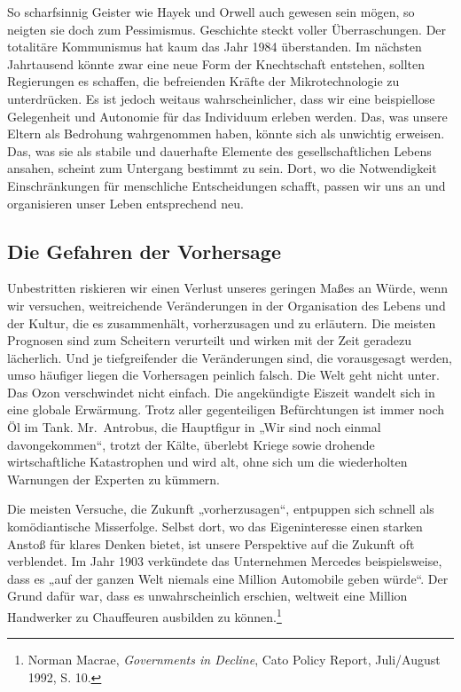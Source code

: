\documentclass[
  a5paper,
  smalldemyvopaper,10pt,twoside,onecolumn,openright,extrafontsizes,hidelinks]{memoir}
\begin{document}
So scharfsinnig Geister wie Hayek und Orwell auch gewesen sein mögen, so
neigten sie doch zum Pessimismus. Geschichte steckt voller
Überraschungen. Der totalitäre Kommunismus hat kaum das Jahr 1984
überstanden. Im nächsten Jahrtausend könnte zwar eine neue Form der
Knechtschaft entstehen, sollten Regierungen es schaffen, die befreienden
Kräfte der Mikrotechnologie zu unterdrücken. Es ist jedoch weitaus
wahrscheinlicher, dass wir eine beispiellose Gelegenheit und Autonomie
für das Individuum erleben werden. Das, was unsere Eltern als Bedrohung
wahrgenommen haben, könnte sich als unwichtig erweisen. Das, was sie als
stabile und dauerhafte Elemente des gesellschaftlichen Lebens ansahen,
scheint zum Untergang bestimmt zu sein. Dort, wo die Notwendigkeit
Einschränkungen für menschliche Entscheidungen schafft, passen wir uns
an und organisieren unser Leben entsprechend neu.

\subsection{Die Gefahren der
Vorhersage}\label{die-gefahren-der-vorhersage}

Unbestritten riskieren wir einen Verlust unseres geringen Maßes an
Würde, wenn wir versuchen, weitreichende Veränderungen in der
Organisation des Lebens und der Kultur, die es zusammenhält,
vorherzusagen und zu erläutern. Die meisten Prognosen sind zum Scheitern
verurteilt und wirken mit der Zeit geradezu lächerlich. Und je
tiefgreifender die Veränderungen sind, die vorausgesagt werden, umso
häufiger liegen die Vorhersagen peinlich falsch. Die Welt geht nicht
unter. Das Ozon verschwindet nicht einfach. Die angekündigte Eiszeit
wandelt sich in eine globale Erwärmung. Trotz aller gegenteiligen
Befürchtungen ist immer noch Öl im Tank. Mr.~Antrobus, die Hauptfigur in
„Wir sind noch einmal davongekommen``, trotzt der Kälte, überlebt Kriege
sowie drohende wirtschaftliche Katastrophen und wird alt, ohne sich um
die wiederholten Warnungen der Experten zu kümmern.

Die meisten Versuche, die Zukunft „vorherzusagen``, entpuppen sich
schnell als komödiantische Misserfolge. Selbst dort, wo das
Eigeninteresse einen starken Anstoß für klares Denken bietet, ist unsere
Perspektive auf die Zukunft oft verblendet. Im Jahr 1903 verkündete das
Unternehmen Mercedes beispielsweise, dass es „auf der ganzen Welt
niemals eine Million Automobile geben würde``. Der Grund dafür war, dass
es unwahrscheinlich erschien, weltweit eine Million Handwerker zu
Chauffeuren ausbilden zu können.\footnote{Norman Macrae,
  \emph{Governments in Decline}, Cato Policy Report, Juli/August 1992,
  S. 10.}
\end{document}
